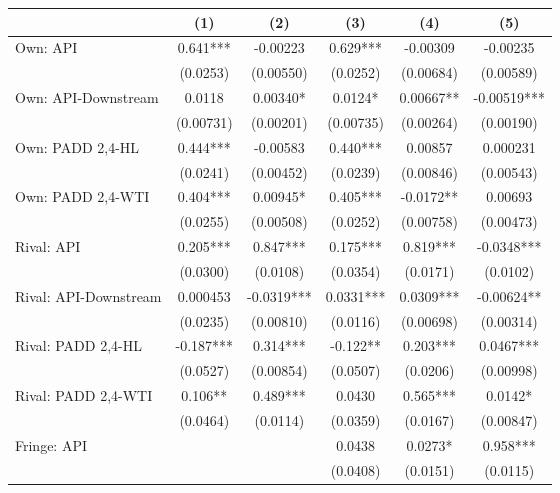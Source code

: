 {
\def\sym#1{\ifmmode^{#1}\else\(^{#1}\)\fi}
\begin{tabular}{l*{5}{c}}
\toprule
                &\multicolumn{1}{c}{(1)}   &\multicolumn{1}{c}{(2)}   &\multicolumn{1}{c}{(3)}   &\multicolumn{1}{c}{(4)}   &\multicolumn{1}{c}{(5)}   \\
\midrule
Own: API        &    0.641***& -0.00223   &    0.629***& -0.00309   & -0.00235   \\
                & (0.0253)   &(0.00550)   & (0.0252)   &(0.00684)   &(0.00589)   \\
\addlinespace
Own: API-Downstream&   0.0118   &  0.00340*  &   0.0124*  &  0.00667** & -0.00519***\\
                &(0.00731)   &(0.00201)   &(0.00735)   &(0.00264)   &(0.00190)   \\
\addlinespace
Own: PADD 2,4-HL&    0.444***& -0.00583   &    0.440***&  0.00857   & 0.000231   \\
                & (0.0241)   &(0.00452)   & (0.0239)   &(0.00846)   &(0.00543)   \\
\addlinespace
Own: PADD 2,4-WTI&    0.404***&  0.00945*  &    0.405***&  -0.0172** &  0.00693   \\
                & (0.0255)   &(0.00508)   & (0.0252)   &(0.00758)   &(0.00473)   \\
\addlinespace
Rival: API      &    0.205***&    0.847***&    0.175***&    0.819***&  -0.0348***\\
                & (0.0300)   & (0.0108)   & (0.0354)   & (0.0171)   & (0.0102)   \\
\addlinespace
Rival: API-Downstream& 0.000453   &  -0.0319***&   0.0331***&   0.0309***& -0.00624** \\
                & (0.0235)   &(0.00810)   & (0.0116)   &(0.00698)   &(0.00314)   \\
\addlinespace
Rival: PADD 2,4-HL&   -0.187***&    0.314***&   -0.122** &    0.203***&   0.0467***\\
                & (0.0527)   &(0.00854)   & (0.0507)   & (0.0206)   &(0.00998)   \\
\addlinespace
Rival: PADD 2,4-WTI&    0.106** &    0.489***&   0.0430   &    0.565***&   0.0142*  \\
                & (0.0464)   & (0.0114)   & (0.0359)   & (0.0167)   &(0.00847)   \\
\addlinespace
Fringe: API     &            &            &   0.0438   &   0.0273*  &    0.958***\\
                &            &            & (0.0408)   & (0.0151)   & (0.0115)   \\

\end{tabular}}
